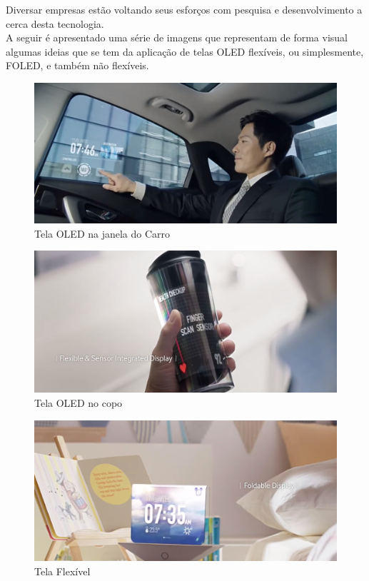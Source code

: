Diversar empresas estão voltando seus esforços com pesquisa e desenvolvimento a cerca desta tecnologia. \\

A seguir é apresentado uma série de imagens que representam de forma visual algumas ideias que se tem da aplicação de telas OLED flexíveis, ou simplesmente, FOLED, e também não flexíveis.\\

\begin{figure}[!ht]
  \centering
  \includegraphics[width=.90\textwidth]{./figuras/oled-future1} 
  \caption{Tela OLED na janela do Carro}
  \label{fig:oled-future1} 
\end{figure}

\begin{figure}[!ht]
  \centering
  \includegraphics[width=.90\textwidth]{./figuras/oled-future2} 
  \caption{Tela OLED no copo}
  \label{fig:oled-future2} 
\end{figure}

\begin{figure}[!ht]
  \centering
  \includegraphics[width=.90\textwidth]{./figuras/oled-future3} 
  \caption{Tela Flexível}
  \label{fig:oled-future3} 
\end{figure}


